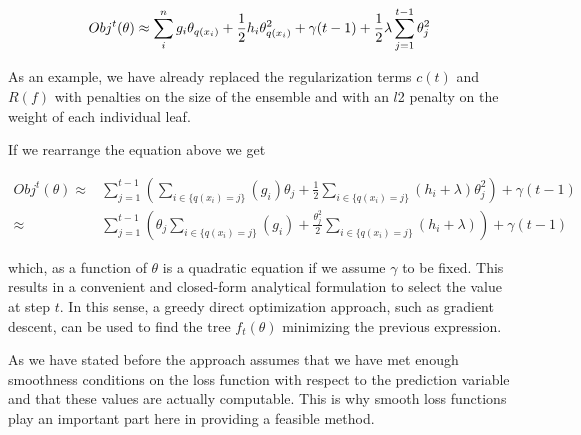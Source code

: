 
\begin{equation}\label{eq:gb-objSteps1}
Obj^t(\theta) \approx \sum_i^n {g_i \theta_{q(x_i)} + \frac{1}{2} h_i \theta_{q(x_i)}^2 } + \gamma ({t-1}) + \frac{1}{2}\lambda \sum_{j=1}^{t-1} \theta_j^2 \\
\end{equation}

As an example, we have already replaced the regularization terms $c(t)$ and $R(f)$ with penalties on the size of the ensemble and with an $l$2 penalty on the weight of each individual leaf.

If we rearrange the equation above we get

\begin{equation}\label{eq:gb-objSteps2}
\begin{split}
Obj^t(\theta) \approx & \sum_{j=1}^{t-1} \left( \sum_{i \in \{q(x_i)=j\}} (g_i )\theta_{j} + \frac{1}{2} \sum_{i \in \{q(x_i)=j\}} (h_i + \lambda ) \theta_{j}^2 \right) + \gamma ({t-1}) \\
\approx & \sum_{j=1}^{t-1} \left( \theta_{j}\sum_{i \in \{q(x_i)=j\}} (g_i ) + \frac{\theta_{j}^2}{2} \sum_{i \in \{q(x_i)=j\}} (h_i + \lambda ) \right) + \gamma ({t-1})
\end{split}
\end{equation}

which, as a function of $\theta$ is a quadratic equation if we assume $\gamma$ to be fixed. This results in a convenient and closed-form analytical formulation to select the value at step $t$. In this sense, a greedy direct optimization approach, such as gradient descent, can be used to find the tree $f_t(\theta)$ minimizing the previous expression.

As we have stated before the approach assumes that we have met enough smoothness conditions on the loss function with respect to the prediction variable
and that these values are actually computable. This is why smooth loss functions play an important part here in providing a feasible method.






